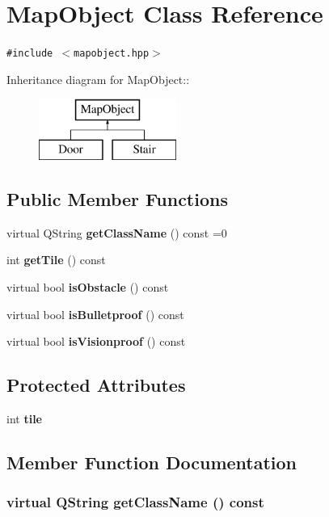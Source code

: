\section{Map\-Object Class Reference}
\label{classMapObject}
{\tt \#include $<$mapobject.hpp$>$}

Inheritance diagram for Map\-Object::\begin{figure}[H]
\begin{center}
\leavevmode
\includegraphics[height=2cm]{classMapObject}
\end{center}
\end{figure}
\subsection*{Public Member Functions}
\begin{CompactItemize}
\item 
virtual QString {\bf get\-Class\-Name} () const =0
\item 
int {\bf get\-Tile} () const 
\item 
virtual bool {\bf is\-Obstacle} () const 
\item 
virtual bool {\bf is\-Bulletproof} () const 
\item 
virtual bool {\bf is\-Visionproof} () const 
\end{CompactItemize}
\subsection*{Protected Attributes}
\begin{CompactItemize}
\item 
int {\bf tile}
\end{CompactItemize}


\subsection{Member Function Documentation}
\subsubsection{\setlength{\rightskip}{0pt plus 5cm}virtual QString get\-Class\-Name () const\hspace{0.3cm}{\tt  [pure virtual]}}\label{classMapObject_a0}




